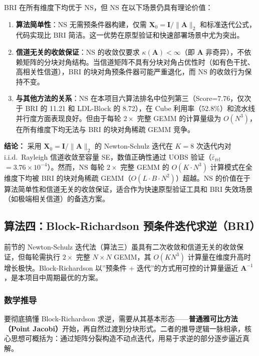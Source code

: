 \documentclass{CjC}
\begin{document}
    BRI 在所有维度下均优于 NS，但 NS 在以下场景仍具有理论价值：
    \begin{enumerate}
        \item \textbf{算法简单性}：NS 无需预条件器构建，仅需 $\bm{X}_{0}=\bm{I}/\|
            \bm{A}\|_{2}$ 和标准迭代公式，代码实现比 BRI 简洁。这一优势在原型验证和快速部署场景中尤为突出。

        \item \textbf{信道无关的收敛保证}：NS 的收敛仅要求 $\kappa(\bm{A})<\infty$（即
            $\bm{A}$
            非奇异），不依赖矩阵的分块对角结构。当信道矩阵不具有分块对角占优性时（如有色干扰、高相关性信道），BRI
            的块对角预条件器可能严重退化，而 NS 的收敛行为保持不变。

        \item \textbf{与其他方法的关系}：NS 在本项目六算法排名中位列第三（Score=7.76，仅次于
            BRI 的 11.21 和 LDL-Block 的 8.72），在 Cube 利用率（52.8\%）和流水线并行度方面表现良好。但由于每轮
            $2\times$ 完整 GEMM 的计算量级为 $O(N^{3})$，在所有维度下均无法与 BRI
            的块对角稀疏 GEMM 竞争。
    \end{enumerate}

    \textbf{结论：} 采用 $\bm{X}_{0}=\bm{I}/\|\bm{A}\|_{2}$ 的 Newton-Schulz 迭代在
    $K=8$ 次迭代内对 i.i.d.\ Rayleigh 信道收敛至容量 SE，数值正确性通过 UOBS
    验证（$\bar{\varepsilon}_{\text{rel}}$ $=3.76\times 10^{-4}$）。然而，NS 每轮 $2\times$ 完整 GEMM
    的 $O(K\cdot N^{3})$ 计算模式在全维度下均被 BRI 的块对角稀疏 GEMM（$O(L\cdot
    B\cdot N^{2})$）超越。NS 的价值在于算法简单性和信道无关的收敛保证，适合作为快速原型验证工具和
    BRI 失效场景（如极端相关信道）的备选方案。

\subsection{算法四：Block-Richardson 预条件迭代求逆（BRI）}
    \label{sec:bri}

    前节的 Newton-Schulz 迭代法（算法三）虽具有二次收敛和信道无关的收敛保证，但每轮需执行 $2\times$ 完整 $N\times N$ GEMM，其 $O(K N^{3})$ 计算量在维度升高时增长极快。Block-Richardson 以”预条件 + 迭代”的方式用可控的计算量逼近
    $\bm{A}^{-1}$，是本项目中周期最优的方案。

    \subsubsection{数学推导}

    要彻底搞懂 Block-Richardson 求逆，需要从其基本形态——\textbf{普通雅可比方法（Point
    Jacobi）}开始，再自然过渡到分块形式。二者的推导逻辑一脉相承，核心思想可概括为：通过矩阵分裂构造不动点迭代，用易于求逆的部分逐步逼近真解。
\end{document}
